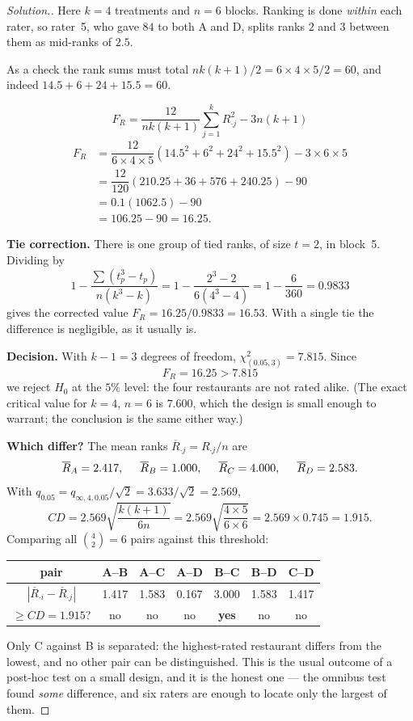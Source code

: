 \documentclass[11pt,a4paper]{article}
\theoremstyle{definition}
\newenvironment{solution}
  {\renewcommand{\qedsymbol}{}\begin{proof}[\textit{Solution}.]}
  {\end{proof}}
\begin{document}
\begin{solution}
Here $k=4$ treatments and $n=6$ blocks. Ranking is done \emph{within} each rater,
so rater~5, who gave $84$ to both A and D, splits ranks $2$ and $3$ between them as
mid-ranks of $2.5$.

As a check the rank sums must total $nk(k+1)/2=6\times 4\times 5/2=60$, and indeed
$14.5+6+24+15.5=60$.

$$F_R=\dfrac{12}{nk(k+1)}\sum^{k}_{j=1}R^{2}_{\cdot j}-3n(k+1)$$
\begin{align*}
F_R &=\dfrac{12}{6\times 4\times 5}\left(14.5^{2}+6^{2}+24^{2}+15.5^{2}\right)-3\times 6\times 5\\
    &=\dfrac{12}{120}\left(210.25+36+576+240.25\right)-90\\
    &=0.1(1062.5)-90\\
    &=106.25-90=16.25 .
\end{align*}

\textbf{Tie correction.} There is one group of tied ranks, of size $t=2$, in
block~5. Dividing by
$$1-\dfrac{\sum\left(t_p^{3}-t_p\right)}{n\left(k^{3}-k\right)}
=1-\dfrac{2^{3}-2}{6\left(4^{3}-4\right)}=1-\dfrac{6}{360}=0.9833$$
gives the corrected value $F_R=16.25/0.9833=16.53$. With a single tie the
difference is negligible, as it usually is.

\textbf{Decision.} With $k-1=3$ degrees of freedom, $\chi^{2}_{(0.05,3)}=7.815$.
Since
$$F_R=16.25>7.815$$
we reject $H_0$ at the $5\%$ level: the four restaurants are not rated alike. (The
exact critical value for $k=4$, $n=6$ is $7.600$, which the design is small enough
to warrant; the conclusion is the same either way.)

\textbf{Which differ?} The mean ranks $\overline{R}_{\cdot j}=R_{\cdot j}/n$ are
$$\overline{R}_{A}=2.417,\hspace{0.5cm}\overline{R}_{B}=1.000,
\hspace{0.5cm}\overline{R}_{C}=4.000,\hspace{0.5cm}\overline{R}_{D}=2.583 .$$
With $q_{0.05}=q_{\infty,4,0.05}/\sqrt{2}=3.633/\sqrt{2}=2.569$,
$$CD=2.569\sqrt{\dfrac{k(k+1)}{6n}}=2.569\sqrt{\dfrac{4\times 5}{6\times 6}}
=2.569\times 0.745=1.915 .$$
Comparing all $\binom{4}{2}=6$ pairs against this threshold:

\begin{table}[H]
\centering
\begin{tabular}{c|cccccc}
pair &A--B&A--C&A--D&B--C&B--D&C--D\\
\hline
$\left|\overline{R}_{\cdot i}-\overline{R}_{\cdot j}\right|$
&1.417&1.583&0.167&3.000&1.583&1.417\\
$\geq CD=1.915$? &no&no&no&\textbf{yes}&no&no\\
\end{tabular}
\end{table}

Only C against B is separated: the highest-rated restaurant differs from the
lowest, and no other pair can be distinguished. This is the usual outcome of a
post-hoc test on a small design, and it is the honest one --- the omnibus test
found \emph{some} difference, and six raters are enough to locate only the largest
of them.

\end{solution}
\end{document}
